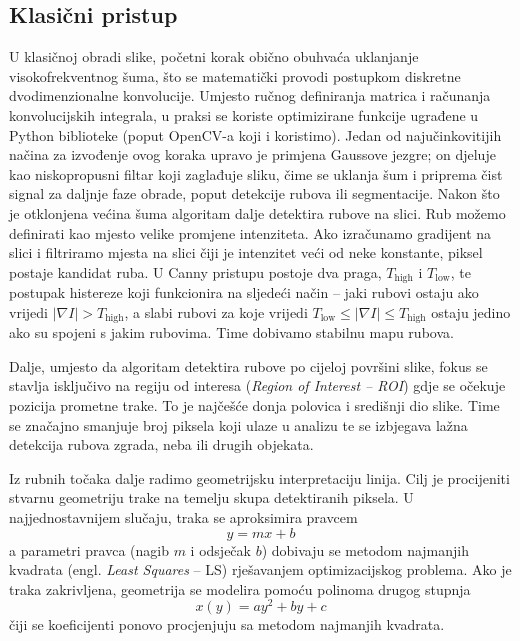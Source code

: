 \subsection{Klasični pristup}
U klasičnoj obradi slike, početni korak obično obuhvaća uklanjanje visokofrekventnog šuma, što se matematički provodi postupkom diskretne dvodimenzionalne konvolucije. Umjesto ručnog definiranja matrica i računanja konvolucijskih integrala, u praksi se koriste optimizirane funkcije ugrađene u Python biblioteke (poput OpenCV-a koji i koristimo). Jedan od najučinkovitijih načina za izvođenje ovog koraka upravo je primjena Gaussove jezgre; on djeluje kao niskopropusni filtar koji zaglađuje sliku, čime se uklanja šum i priprema čist signal za daljnje faze obrade, poput detekcije rubova ili segmentacije.
Nakon što je otklonjena većina šuma algoritam dalje detektira rubove na slici.
Rub možemo definirati kao mjesto velike promjene intenziteta. Ako izračunamo gradijent na slici i filtriramo mjesta na slici čiji je intenzitet veći od neke konstante, piksel postaje kandidat ruba. U Canny pristupu\supercite{canny1986} postoje dva praga, \(T_{\text{high}}\) i \(T_{\text{low}}\), te postupak histereze koji funkcionira na sljedeći način \--- jaki rubovi ostaju ako vrijedi \(\vert{}\nabla I\vert{} > T_{\text{high}}\), a slabi rubovi za koje vrijedi \(T_{\text{low}} \le \vert{}\nabla I\vert{} \le T_{\text{high}}\) ostaju jedino ako su spojeni s jakim rubovima. Time dobivamo stabilnu mapu rubova.

Dalje, umjesto da algoritam detektira rubove po cijeloj površini slike, fokus se stavlja isključivo na regiju od interesa (\textit{Region of Interest \--- ROI}) gdje se očekuje pozicija prometne trake. To je najčešće donja polovica i središnji dio slike. Time se značajno smanjuje broj piksela koji ulaze u analizu te se izbjegava lažna detekcija rubova zgrada, neba ili drugih objekata.

Iz rubnih točaka dalje radimo geometrijsku interpretaciju linija. Cilj je procijeniti stvarnu geometriju trake na temelju skupa detektiranih piksela. U najjednostavnijem slučaju, traka se aproksimira pravcem
\begin{equation}
    y = mx + b
\end{equation}
a parametri pravca (nagib $m$ i odsječak $b$) dobivaju se metodom najmanjih kvadrata (engl. \textit{Least Squares} \--- LS) rješavanjem optimizacijskog problema.
Ako je traka zakrivljena, geometrija se modelira pomoću polinoma drugog stupnja
\begin{equation}
    x(y) = ay^2 + by + c
\end{equation}
čiji se koeficijenti ponovo procjenjuju sa metodom najmanjih kvadrata.

